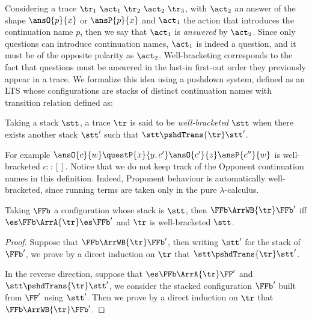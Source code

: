 Considering a trace $\tr_1 \ \act_1  \ \tr_2 \ \act_2 \ \tr_3$,
with $\act_2$ an answer of the shape $\ansO{p}{x}$ or $\ansP{p}{x}$
and $\act_1$ the action that introduces the continuation name $p$,
then we say that $\act_1$ is \emph{answered} by $\act_2$.
Since only questions can introduce continuation names, 
$\act_1$ is indeed a question, and it must be of the opposite polarity
as $\act_2$.
%
Well-bracketing corresponds to the fact that questions must be answered in the last-in
first-out order they previously appear in a trace.
We formalize this idea using a pushdown system, defined as an LTS whose configurations are 
stacks of distinct continuation names with transition relation defined as:

\begin{definition}
Taking a stack $\stt$,
a trace $\tr$ is said to be \emph{well-bracketed} \wrt $\stt$ when
there exists another stack $\stt'$ such that
$\stt \pshdTrans{\tr} \stt'$.
\end{definition}
%
For example $\ansO{c}{w} \questP{x}{y,c'} \ansO{c'}{z} \ansP{c''}{w}$
is well-bracketed \wrt $c::[]$.
Notice that we do not keep track of the Opponent continuation names in this definition.
Indeed, Proponent behaviour is automatically well-bracketed,
since running terms are taken only in the pure $\lambda$-calculus.

\begin{lemma}
\label{l:WBs_lts}
Taking $\FFb$ a configuration whose stack is $\stt$, then
$\FFb \ArrWB{\tr} \FFb'$ iff 
$\es \FFb \ArrA{\tr} \es \FFb'$ and $\tr$ is well-bracketed \wrt $\stt$.
\end{lemma} 

\begin{proof}
  Suppose that $\FFb \ArrWB{\tr} \FFb'$,
  then writing $\stt'$ for the stack of $\FFb'$,
  we prove by a direct induction on $\tr$ that $\stt \pshdTrans{\tr} \stt'$.

  In the reverse direction, suppose that 
  $\es \FFb \ArrA{\tr} \FF'$ and $\stt \pshdTrans{\tr} \stt'$,
  we consider the stacked configuration $\FFb'$ built 
  from $\FF'$ using $\stt'$.
  Then we prove by a direct induction on $\tr$ that
  $\FFb \ArrWB{\tr} \FFb'$.
\end{proof}

